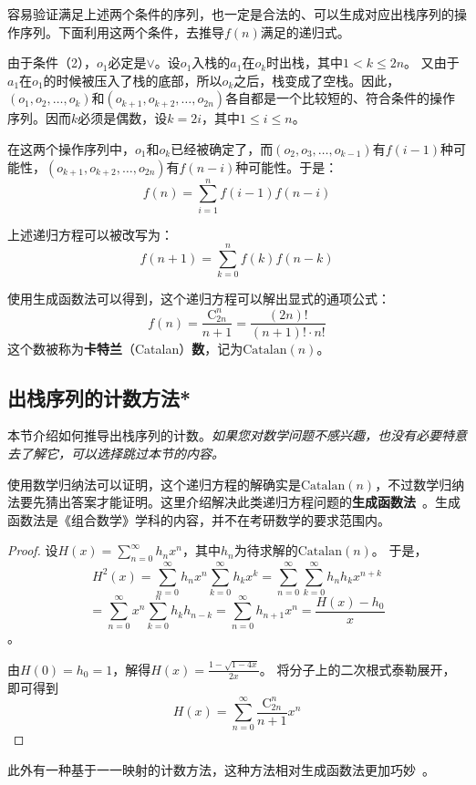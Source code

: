 容易验证满足上述两个条件的序列，也一定是合法的、可以生成对应出栈序列的操作序列。下面利用这两个条件，去推导$f(n)$满足的递归式。

由于条件（2），$o_1$必定是$\lor$。设$o_1$入栈的$a_1$在$o_k$时出栈，其中$1<k\le2n$。
又由于$a_1$在$o_1$的时候被压入了栈的底部，所以$o_k$之后，栈变成了空栈。因此，$(o_1,o_2,\dots,o_k)$和$(o_{k+1},o_{k+2},\dots,o_{2n})$各自都是一个比较短的、符合条件的操作序列。因而$k$必须是偶数，设$k = 2i$，其中$1\le i \le n$。

在这两个操作序列中，$o_1$和$o_k$已经被确定了，而$(o_2,o_3,\dots,o_{k-1})$有$f(i-1)$种可能性，$(o_{k+1},o_{k+2},\dots,o_{2n})$有$f(n-i)$种可能性。于是：
$$
f(n)=\sum_{i=1}^{n}f(i-1)f(n-i)
$$

上述递归方程可以被改写为：
$$
f(n+1)=\sum_{k=0}^n f(k)f(n-k)
$$

使用生成函数法可以得到，这个递归方程可以解出显式的通项公式：
$$
f(n)=\frac{\mathrm{C}_{2n}^n}{n+1}=\frac{(2n)!}{(n+1)!\cdot n!}
$$
这个数被称为\textbf{卡特兰}（Catalan）\textbf{数}，记为$\mathrm{Catalan}(n)$。

\subsection{出栈序列的计数方法*}

本节介绍如何推导出栈序列的计数。\textit{如果您对数学问题不感兴趣，也没有必要特意去了解它，可以选择跳过本节的内容。}

使用数学归纳法可以证明，这个递归方程的解确实是$\mathrm{Catalan}(n)$，不过数学归纳法要先猜出答案才能证明。这里介绍解决此类递归方程问题的\textbf{生成函数法}~\cite{cormen2022introduction}。生成函数法是《组合数学》学科的内容，并不在考研数学的要求范围内。

\begin{proof}
设$H(x)=\sum\limits_{n=0}^\infty h_n x^n$，其中$h_n$为待求解的$\mathrm{Catalan}(n)$。
于是，
$$H^2(x)=\sum_{n=0}^\infty h_n x^n\sum_{k=0}^\infty h_k x^k=\sum_{n=0}^\infty\sum_{k=0}^\infty h_nh_k x^{n+k}$$
$$
=\sum_{n=0}^\infty x^n\sum_{k=0}^{n}h_kh_{n-k}=\sum_{n=0}^\infty h_{n+1}x^n=\frac{H(x)-h_0}x$$。

由$H(0)=h_0=1$，解得$H(x)=\frac{1-\sqrt{1-4x}}{2x}$。
将分子上的二次根式泰勒展开，即可得到
$$H(x)=\sum_{n=0}^\infty \frac{\mathrm{C}_{2n}^n}{n+1}x^n$$
\end{proof}

此外有一种基于一一映射的计数方法，这种方法相对生成函数法更加巧妙~\cite{knuth1997art}。

